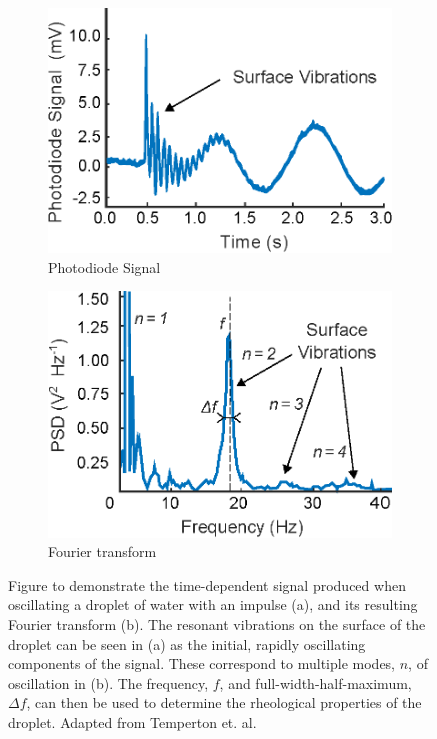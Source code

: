 \documentclass{physics_article_B}
\begin{document}
        \begin{figure}[H]
            \centering
                \begin{subfigure}[b]{0.48\textwidth}\hspace*{-0.2cm}\includegraphics[width=\textwidth]{Figures/TempertonSignal.eps}
                    \caption{Photodiode Signal}
                    \label{fig:temperton:signal}
                \end{subfigure}\hspace{3pt}
                \begin{subfigure}[b]{0.48\textwidth}\hspace*{0.2cm}\includegraphics[width=\textwidth]{Figures/TempertonSignalPD.eps}
                    \caption{Fourier transform}
                    \label{fig:temperton:PD}
                \end{subfigure}
            \caption{Figure to demonstrate the time-dependent signal produced when oscillating a droplet of water with an impulse (a), and its resulting Fourier transform (b). The resonant vibrations on the surface of the droplet can be seen in (a) as the initial, rapidly oscillating components of the signal. These correspond to multiple modes, $n$, of oscillation in (b). The frequency, $f$, and full-width-half-maximum, $\Delta f$, can then be used to determine the rheological properties of the droplet. Adapted from Temperton et. al.\cite{temperton}}\label{fig:temperton}
        \end{figure}
\end{document}
